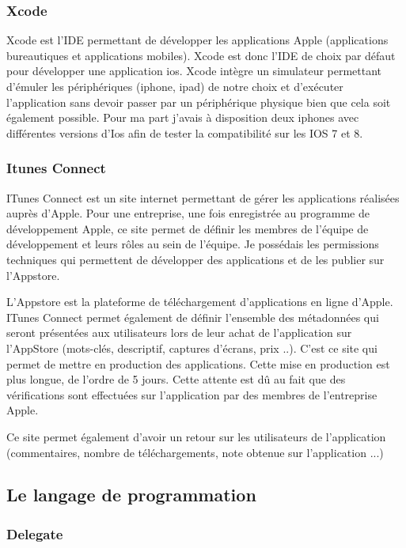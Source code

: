 \subsubsection{Xcode}
Xcode est l’IDE permettant de développer les applications Apple (applications bureautiques et applications mobiles). Xcode est donc l’IDE de choix par défaut pour développer une application ios. Xcode intègre un simulateur permettant d’émuler les périphériques (iphone, ipad) de notre choix et d’exécuter l’application sans devoir passer par un périphérique physique bien que cela soit également possible. Pour ma part j'avais à disposition deux iphones avec différentes versions d'Ios afin de tester la compatibilité sur les IOS 7 et 8. 

\subsubsection{Itunes Connect}
ITunes Connect est un site internet permettant de gérer les applications réalisées auprès d’Apple. Pour une entreprise, une fois enregistrée au programme de développement Apple, ce site permet de définir les membres de l’équipe de développement et leurs rôles au sein de l’équipe. Je possédais les permissions techniques qui permettent de développer des applications et de les publier sur l’Appstore. 

L'Appstore est la plateforme de téléchargement d'applications en ligne d'Apple. ITunes Connect permet également de définir l’ensemble des métadonnées qui seront présentées aux utilisateurs lors de leur achat de l’application sur l’AppStore (mots-clés, descriptif, captures d’écrans, prix ..). C'est ce site qui permet de mettre en production des applications. Cette mise en production est plus longue, de l'ordre de 5 jours. Cette attente est dû au fait que des vérifications sont effectuées sur l'application par des membres de l'entreprise Apple.

Ce site permet également d'avoir un retour sur les utilisateurs de l'application (commentaires, nombre de téléchargements, note obtenue sur l'application ...)


\subsection{Le langage de programmation}

\subsubsection{Delegate}

